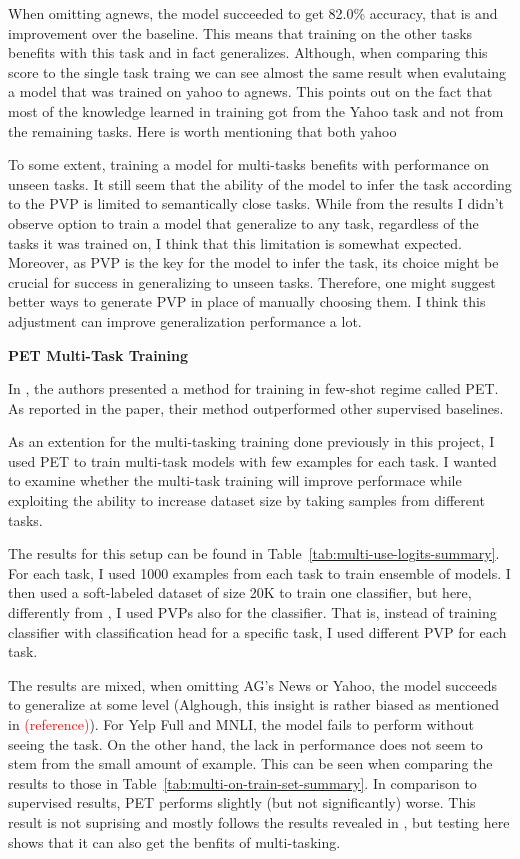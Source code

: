 \documentclass[11pt,a4paper]{article}
\newcommand\todo[1]{\textcolor{red}{#1}}
\begin{document}
When omitting agnews, the model succeeded to get 82.0\% accuracy, that is and improvement over the baseline.
This means that training on the other tasks benefits with this task and in fact generalizes.
Although, when comparing this score to the single task traing we can see almost the same result when evalutaing a model that was trained on yahoo to agnews.
This points out on the fact that most of the knowledge learned in training got from the Yahoo task and not from the remaining tasks.
Here is worth mentioning that both yahoo

To some extent, training a model for multi-tasks benefits with performance on unseen tasks.
It still seem that the ability of the model to infer the task according to the PVP is limited to semantically close tasks.
While from the results I didn't observe option to train a model that generalize to any task, regardless of the tasks it was trained on, I think that this limitation is somewhat expected.
Moreover, as PVP is the key for the model to infer the task, its choice might be crucial for success in generalizing to unseen tasks.
Therefore, one might suggest better ways to generate PVP in place of manually choosing them.
I think this adjustment can improve generalization performance a lot.


\vspace{8pt}
\noindent\textbf{PET Multi-Task Training}\quad

In \citet{schick2020exploiting}, the authors presented a method for training in few-shot regime called PET.
As reported in the paper, their method outperformed other supervised baselines.

As an extention for the multi-tasking training done previously in this project, I used PET to train multi-task models with few examples for each task.
I wanted to examine whether the multi-task training will improve performace while exploiting the ability to increase dataset size by taking samples from different tasks.

The results for this setup can be found in Table~\ref{tab:multi-use-logits-summary}.
For each task, I used 1000 examples from each task to train ensemble of models.
I then used a soft-labeled dataset of size 20K to train one classifier, but here, differently from \citet{schick2020exploiting}, I used PVPs also for the classifier.
That is, instead of training classifier with classification head for a specific task, I used different PVP for each task.

The results are mixed, when omitting AG's News or Yahoo, the model succeeds to generalize at some level (Alghough, this insight is rather biased as mentioned in \todo{(reference)}).
For Yelp Full and MNLI, the model fails to perform without seeing the task.
On the other hand, the lack in performance does not seem to stem from the small amount of example.
This can be seen when comparing the results to those in Table~\ref{tab:multi-on-train-set-summary}.
In comparison to supervised results, PET performs slightly (but not significantly) worse.
This result is not suprising and mostly follows the results revealed in \citet{schick2020exploiting}, but testing here shows that it can also get the benfits of multi-tasking.
\end{document}
